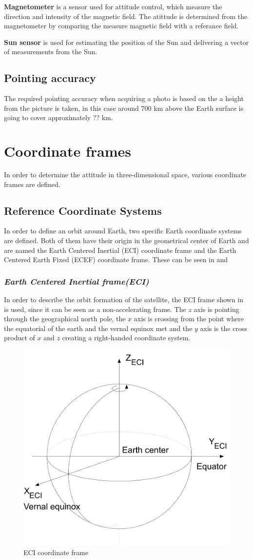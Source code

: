 \textbf{Magnetometer} is a sensor used for attitude control, which measure the direction and intensity of the magnetic field. The atittude is determined from the magnetometer by comparing the measure magnetic field with a referance field.

\textbf{Sun sensor} is used for estimating the position of the Sun and delivering a vector of measurements from the Sun.
%
\subsection{Pointing accuracy}
The required pointing accuracy when acquiring a photo is based on the a height from the picture is taken, in this case around 700 km above the Earth surface is going to cover approximately ?? km. 

\section{Coordinate frames}
In order to determine the attitude in three-dimensional space, various coordinate frames are defined.
\subsection{Reference Coordinate Systems}
In order to define an orbit around Earth, two specific Earth coordinate systems are defined. Both of them have their origin in the geometrical center of Earth and are named the Earth Centered Inertial (ECI) coordinate frame and the Earth Centered Earth Fixed (ECEF) coordinate frame. These can be seen in  and 
\subsubsection{\textit{Earth Centered Inertial frame(ECI)}}
In order to describe the orbit formation of the satellite, the ECI frame shown in  is used, since it can be seen as a non-accelerating frame. The $z$ axis is pointing through the geographical north pole, the $x$ axis is crossing from the point where the equatorial of the earth and the vernal equinox met and the $y$ axis is the cross product of $x$ and $z$ creating a right-handed coordinate system. 
\begin{figure}[H]
	\centering
	\includegraphics[width=0.5\linewidth]{figures/ECI}
	\caption{ECI coordinate frame}
	\label{fig:ECI}
\end{figure}
